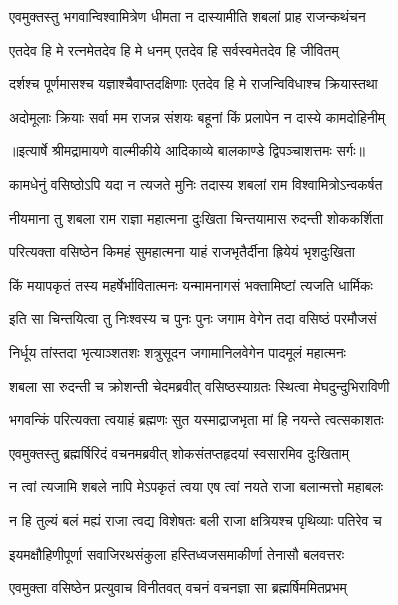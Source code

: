 \twolineshloka
{एवमुक्तस्तु भगवान्विश्वामित्रेण धीमता}
{न दास्यामीति शबलां प्राह राजन्कथंचन} %

\twolineshloka
{एतदेव हि मे रत्नमेतदेव हि मे धनम्}
{एतदेव हि सर्वस्वमेतदेव हि जीवितम्} %

\twolineshloka
{दर्शश्च पूर्णमासश्च यज्ञाश्चैवाप्तदक्षिणाः}
{एतदेव हि मे राजन्विविधाश्च क्रियास्तथा} %

\twolineshloka
{अदोमूलाः क्रियाः सर्वा मम राजन्न संशयः}
{बहूनां किं प्रलापेन न दास्ये कामदोहिनीम्} %


{॥इत्यार्षे श्रीमद्रामायणे वाल्मीकीये आदिकाव्ये बालकाण्डे द्विपञ्चाशत्तमः सर्गः॥}


\twolineshloka
{कामधेनुं वसिष्ठोऽपि यदा न त्यजते मुनिः}
{तदास्य शबलां राम विश्वामित्रोऽन्वकर्षत} %

\twolineshloka
{नीयमाना तु शबला राम राज्ञा महात्मना}
{दुःखिता चिन्तयामास रुदन्ती शोककर्शिता} %

\twolineshloka
{परित्यक्ता वसिष्ठेन किमहं सुमहात्मना}
{याहं राजभृतैर्दीना ह्रियेयं भृशदुःखिता} %

\twolineshloka
{किं मयापकृतं तस्य महर्षेर्भावितात्मनः}
{यन्मामनागसं भक्तामिष्टां त्यजति धार्मिकः} %

\twolineshloka
{इति सा चिन्तयित्वा तु निःश्वस्य च पुनः पुनः}
{जगाम वेगेन तदा वसिष्ठं परमौजसं} %

\twolineshloka
{निर्धूय तांस्तदा भृत्याञ्शतशः शत्रुसूदन}
{जगामानिलवेगेन पादमूलं महात्मनः} %

\twolineshloka
{शबला सा रुदन्ती च क्रोशन्ती चेदमब्रवीत्}
{वसिष्ठस्याग्रतः स्थित्वा मेघदुन्दुभिराविणी} %

\twolineshloka
{भगवन्किं परित्यक्ता त्वयाहं ब्रह्मणः सुत}
{यस्माद्राजभृता मां हि नयन्ते त्वत्सकाशतः} %

\twolineshloka
{एवमुक्तस्तु ब्रह्मर्षिरिदं वचनमब्रवीत्}
{शोकसंतप्तहृदयां स्वसारमिव दुःखिताम्} %

\twolineshloka
{न त्वां त्यजामि शबले नापि मेऽपकृतं त्वया}
{एष त्वां नयते राजा बलान्मत्तो महाबलः} %

\twolineshloka
{न हि तुल्यं बलं मह्यं राजा त्वद्य विशेषतः}
{बली राजा क्षत्रियश्च पृथिव्याः पतिरेव च} %

\twolineshloka
{इयमक्षौहिणीपूर्णा सवाजिरथसंकुला}
{हस्तिध्वजसमाकीर्णा तेनासौ बलवत्तरः} %

\twolineshloka
{एवमुक्ता वसिष्ठेन प्रत्युवाच विनीतवत्}
{वचनं वचनज्ञा सा ब्रह्मर्षिममितप्रभम्} %

